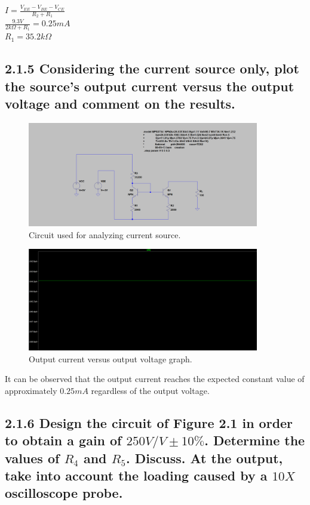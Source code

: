 \documentclass[12pt]{article}
\begin{document}
$I = \frac{V_{EE} - V_{BE} - V_{CE}}{R_2 + R_1}$ \\

$\frac{9.3V}{2k\Omega + R_1} = 0.25mA$ \\

$R_1 = 35.2k\Omega$


\subsection*{2.1.5 Considering the current source only, plot the source’s output current versus the output voltage and comment on the results.}

\begin{figure}[H]
\centering
\includegraphics[width=0.9\textwidth]{Screenshots/Circuit_215.png}
\caption{\label{fig:current-circuit} Circuit used for analyzing current source.}
\end{figure}

\begin{figure}[H]
\centering
\includegraphics[width=0.9\textwidth]{Screenshots/Graph_215.png}
\caption{\label{fig:current-voltage} Output current versus output voltage graph.}
\end{figure}

It can be observed that the output current reaches the expected constant value of approximately $0.25mA$ regardless of the output voltage.

\subsection*{2.1.6 Design the circuit of Figure 2.1 in order to obtain a gain of $250V/V ±10\%$. Determine the values of $R_4$ and $R_5$. Discuss. At the output, take into account the loading caused by a $10X$ oscilloscope probe.}
\end{document}
